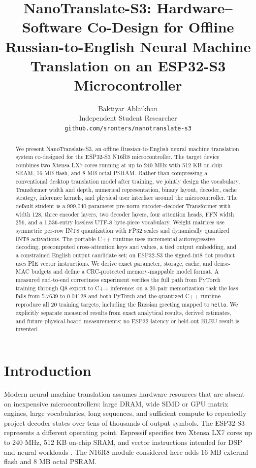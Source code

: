 \documentclass{article}
\title{NanoTranslate-S3: Hardware--Software Co-Design for Offline Russian-to-English Neural Machine Translation on an ESP32-S3 Microcontroller}
\author{
Baktiyar Ablaikhan\\
Independent Student Researcher\\
\texttt{github.com/sronters/nanotranslate-s3}
}
\newcommand{\modelname}{NanoTranslate-S3}
\begin{document}
\maketitle

\begin{abstract}
We present \modelname, an offline Russian-to-English neural machine translation system co-designed for the ESP32-S3 N16R8 microcontroller. The target device combines two Xtensa LX7 cores running at up to 240 MHz with 512 KB on-chip SRAM, 16 MB flash, and 8 MB octal PSRAM. Rather than compressing a conventional desktop translation model after training, we jointly design the vocabulary, Transformer width and depth, numerical representation, binary layout, decoder, cache strategy, inference kernels, and physical user interface around the microcontroller. The default student is a 999,040-parameter pre-norm encoder--decoder Transformer with width 128, three encoder layers, two decoder layers, four attention heads, FFN width 256, and a 1,536-entry lossless UTF-8 byte-piece vocabulary. Weight matrices use symmetric per-row INT8 quantization with FP32 scales and dynamically quantized INT8 activations. The portable C++ runtime uses incremental autoregressive decoding, precomputed cross-attention keys and values, a tied output embedding, and a constrained English output candidate set; on ESP32-S3 the signed-int8 dot product uses PIE vector instructions. We derive exact parameter, storage, cache, and dense-MAC budgets and define a CRC-protected memory-mappable model format. A measured end-to-end correctness experiment verifies the full path from PyTorch training through Q8 export to C++ inference: on a 20-pair memorization task the loss falls from 5.7639 to 0.04128 and both PyTorch and the quantized C++ runtime reproduce all 20 training targets, including the Russian greeting mapped to \texttt{hello}. We explicitly separate measured results from exact analytical results, derived estimates, and future physical-board measurements; no ESP32 latency or held-out BLEU result is invented.
\end{abstract}

\section{Introduction}
Modern neural machine translation assumes hardware resources that are absent on inexpensive microcontrollers: large DRAM, wide SIMD or GPU matrix engines, large vocabularies, long sequences, and sufficient compute to repeatedly project decoder states over tens of thousands of output symbols. The ESP32-S3 represents a different operating point. Espressif specifies two Xtensa LX7 cores up to 240 MHz, 512 KB on-chip SRAM, and vector instructions intended for DSP and neural workloads \citep{espressif_s3}. The N16R8 module considered here adds 16 MB external flash and 8 MB octal PSRAM.
\end{document}
